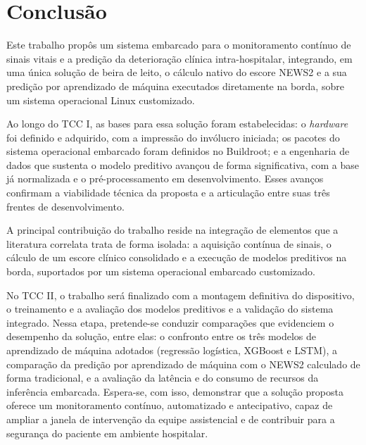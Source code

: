 \section{Conclusão}

Este trabalho propôs um sistema embarcado para o monitoramento contínuo de sinais vitais e a predição da deterioração clínica intra-hospitalar, integrando, em uma única solução de beira de leito, o cálculo nativo do escore NEWS2 e a sua predição por aprendizado de máquina executados diretamente na borda, sobre um sistema operacional Linux customizado.

Ao longo do TCC I, as bases para essa solução foram estabelecidas: o \textit{hardware} foi definido e adquirido, com a impressão do invólucro iniciada; os pacotes do sistema operacional embarcado foram definidos no Buildroot; e a engenharia de dados que sustenta o modelo preditivo avançou de forma significativa, com a base já normalizada e o pré-processamento em desenvolvimento. Esses avanços confirmam a viabilidade técnica da proposta e a articulação entre suas três frentes de desenvolvimento.

A principal contribuição do trabalho reside na integração de elementos que a literatura correlata trata de forma isolada: a aquisição contínua de sinais, o cálculo de um escore clínico consolidado e a execução de modelos preditivos na borda, suportados por um sistema operacional embarcado customizado.

No TCC II, o trabalho será finalizado com a montagem definitiva do dispositivo, o treinamento e a avaliação dos modelos preditivos e a validação do sistema integrado. Nessa etapa, pretende-se conduzir comparações que evidenciem o desempenho da solução, entre elas: o confronto entre os três modelos de aprendizado de máquina adotados (regressão logística, XGBoost e LSTM), a comparação da predição por aprendizado de máquina com o NEWS2 calculado de forma tradicional, e a avaliação da latência e do consumo de recursos da inferência embarcada. Espera-se, com isso, demonstrar que a solução proposta oferece um monitoramento contínuo, automatizado e antecipativo, capaz de ampliar a janela de intervenção da equipe assistencial e de contribuir para a segurança do paciente em ambiente hospitalar.
